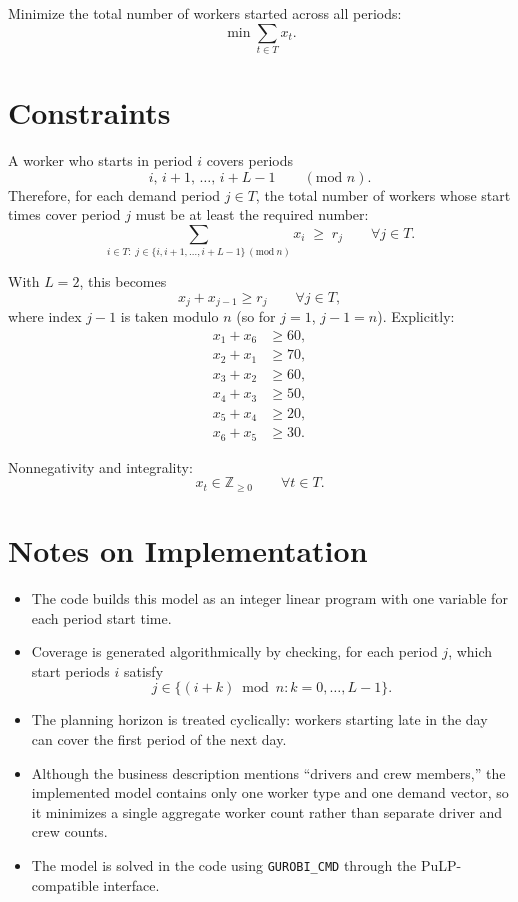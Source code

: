 Minimize the total number of workers started across all periods:
\[
\min \sum_{t \in T} x_t.
\]

\section*{Constraints}

A worker who starts in period $i$ covers periods
\[
i,\, i+1,\, \dots,\, i+L-1
\qquad (\text{mod } n).
\]
Therefore, for each demand period $j \in T$, the total number of workers whose start times cover period $j$ must be at least the required number:
\[
\sum_{i \in T:\; j \in \{i,i+1,\dots,i+L-1\}\,(\mathrm{mod}\ n)} x_i \;\ge\; r_j
\qquad \forall j \in T.
\]

With $L=2$, this becomes
\[
x_j + x_{j-1} \ge r_j
\qquad \forall j \in T,
\]
where index $j-1$ is taken modulo $n$ (so for $j=1$, $j-1=n$). Explicitly:
\begin{align*}
x_1 + x_6 &\ge 60,\\
x_2 + x_1 &\ge 70,\\
x_3 + x_2 &\ge 60,\\
x_4 + x_3 &\ge 50,\\
x_5 + x_4 &\ge 20,\\
x_6 + x_5 &\ge 30.
\end{align*}

Nonnegativity and integrality:
\[
x_t \in \mathbb{Z}_{\ge 0}
\qquad \forall t \in T.
\]

\section*{Notes on Implementation}

\begin{itemize}
    \item The code builds this model as an integer linear program with one variable for each period start time.
    \item Coverage is generated algorithmically by checking, for each period $j$, which start periods $i$ satisfy
    \[
    j \in \{(i+k) \bmod n : k=0,\dots,L-1\}.
    \]
    \item The planning horizon is treated cyclically: workers starting late in the day can cover the first period of the next day.
    \item Although the business description mentions ``drivers and crew members,'' the implemented model contains only one worker type and one demand vector, so it minimizes a single aggregate worker count rather than separate driver and crew counts.
    \item The model is solved in the code using \texttt{GUROBI\_CMD} through the PuLP-compatible interface.
\end{itemize}
